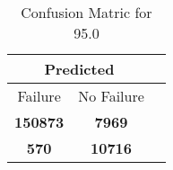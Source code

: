 \begin{table}[] 
\caption{Confusion Matric for 95.0} 
\label{Table: Prediction Accuracy-None95.0DecisionTrees100EKF-ignoreReflection-Reflection} 
\centering 
\begin{tabular} 
 {@{}ccc@{}} 
\toprule 
\multicolumn{2}{c}{\textbf{Predicted}}
 \\ \midrule 
\multicolumn{1}{|c|}{Failure} & 
\multicolumn{1}{c|}{No Failure}
 \\ \midrule 
\multicolumn{1}{|c|}{\color{green}\textbf{150873}} & 
\multicolumn{1}{c|}{\color{red}\textbf{7969}}
 \\ \midrule 
\multicolumn{1}{|c|}{\color{red}\textbf{570}} & 
\multicolumn{1}{c|}{\color{green}\textbf{10716}}
 \\ \bottomrule 
\end{tabular} 
\end{table} 
